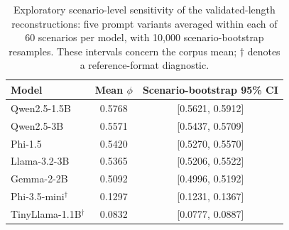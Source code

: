 \begin{table}[ht]
\centering
\caption{Exploratory scenario-level sensitivity of the validated-length reconstructions: five prompt variants averaged within each of 60 scenarios per model, with 10,000 scenario-bootstrap resamples. These intervals concern the corpus mean; $\dagger$ denotes a reference-format diagnostic.}
\label{tab:scenario_sensitivity}
\begin{tabular}{l c c}
\toprule
Model & Mean $\phi$ & Scenario-bootstrap 95\% CI \\
\midrule
Qwen2.5-1.5B & 0.5768 & [0.5621, 0.5912] \\
Qwen2.5-3B & 0.5571 & [0.5437, 0.5709] \\
Phi-1.5 & 0.5420 & [0.5270, 0.5570] \\
Llama-3.2-3B & 0.5365 & [0.5206, 0.5522] \\
Gemma-2-2B & 0.5092 & [0.4996, 0.5192] \\
Phi-3.5-mini$^{\dagger}$ & 0.1297 & [0.1231, 0.1367] \\
TinyLlama-1.1B$^{\dagger}$ & 0.0832 & [0.0777, 0.0887] \\
\bottomrule
\end{tabular}
\end{table}

\begin{table}[ht]
\centering
\caption{Separate cohorts with verified full-sequence references ($N=300$ per model; 512-token victim limit; all segments, three T5 samples per segment and 80-token T5 input and output limits). Mean-$\phi$ intervals use 10,000 resamples of 60 scenarios. These rows form a targeted reference-validation experiment and are analyzed separately from the seven archived-reference cohorts. EOS indicates end-of-sequence termination, not reconstruction correctness.}
\label{tab:fresh_results}
\end{table}

